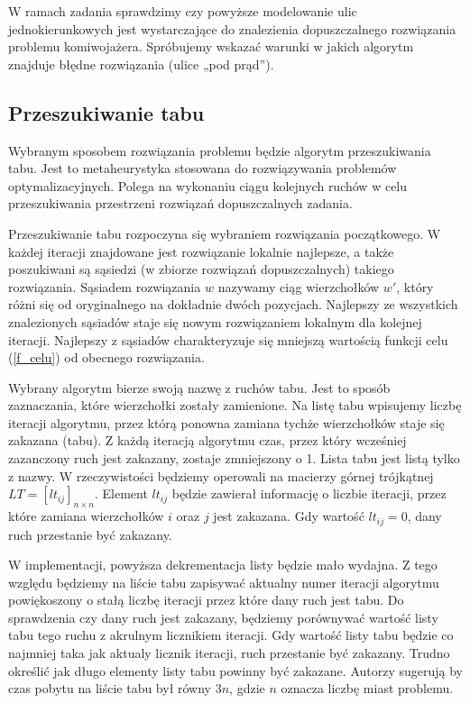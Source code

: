 \documentclass[11pt,a4paper,twoside]{article}
\begin{document}
W ramach zadania sprawdzimy czy powyższe modelowanie ulic jednokierunkowych jest wystarczające do znalezienia dopuszczalnego rozwiązania problemu komiwojażera. Spróbujemy wskazać warunki w jakich algorytm znajduje błędne rozwiązania (ulice „pod prąd”).

\subsection{Przeszukiwanie tabu}
Wybranym sposobem rozwiązania problemu będzie algorytm przeszukiwania tabu. Jest to metaheurystyka stosowana do rozwiązywania problemów optymalizacyjnych. Polega na  wykonaniu ciągu kolejnych ruchów w celu przeszukiwania przestrzeni rozwiązań dopuszczalnych zadania. 

Przeszukiwanie tabu rozpoczyna się wybraniem rozwiązania początkowego. W każdej iteracji znajdowane jest rozwiązanie lokalnie najlepsze, a także poszukiwani są sąsiedzi (w zbiorze rozwiązań dopuszczalnych) takiego rozwiązania. Sąsiadem rozwiązania $w$ nazywamy ciąg wierzchołków $w'$, który różni się od oryginalnego na dokładnie dwóch pozycjach. Najlepszy ze wszystkich znalezionych sąsiadów staje się nowym rozwiązaniem lokalnym dla kolejnej iteracji. Najlepszy z sąsiadów charakteryzuje się mniejszą wartością funkcji celu (\ref{f_celu}) od obecnego rozwiązania.

Wybrany algorytm bierze swoją nazwę z ruchów tabu. Jest to sposób zaznaczania, które wierzchołki zostały zamienione. Na listę tabu wpisujemy liczbę iteracji algorytmu, przez którą ponowna zamiana tychże wierzchołków staje się zakazana (tabu). Z każdą iteracją algorytmu czas, przez który wcześniej zazanczony ruch jest zakazany, zostaje zmniejszony o 1. Lista tabu jest listą tylko z nazwy. W rzeczywistości będziemy operowali na macierzy górnej trójkątnej $LT = [lt_{ij}]_{n\times n}$. Element $lt_{ij}$ będzie zawierał informację o liczbie iteracji, przez które zamiana wierzchołków $i$ oraz $j$ jest zakazana. Gdy wartość $lt_{ij} = 0$, dany ruch przestanie być zakazany. 

W implementacji, powyższa dekrementacja listy będzie mało wydajna. Z tego względu będziemy na liście tabu zapisywać aktualny numer iteracji algorytmu powiękoszony o stałą liczbę iteracji przez które dany ruch jest tabu. Do sprawdzenia czy dany ruch jest zakazany, będziemy porównywać wartość listy tabu tego ruchu z akrulnym licznikiem iteracji. Gdy wartość listy tabu będzie co najmniej taka jak aktualy licznik iteracji, ruch przestanie być zakazany. Trudno określić jak długo elementy listy tabu powinny być zakazane. Autorzy \cite{FogelHeurystyka} sugerują by czas pobytu na liście tabu był równy $3n$, gdzie $n$ oznacza liczbę miast problemu.
\end{document}
